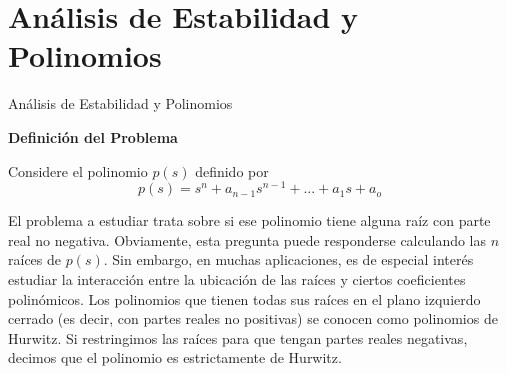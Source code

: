 \documentclass{beamer}
\begin{document}
\section{Análisis de Estabilidad y Polinomios}
\begin{frame}{Análisis de Estabilidad y Polinomios}
\begin{justify}
\textbf{Definición del Problema}
\vspace{0.3cm}

Considere el polinomio $p(s)$ definido por
\[p(s)=s^n+a_{n-1}s^{n-1}+ ... +a_1s+a_o\]



El problema a estudiar trata sobre si ese polinomio tiene alguna raíz con parte real no negativa. Obviamente, esta pregunta puede responderse calculando las $n$ raíces de $p(s)$. Sin embargo, en muchas aplicaciones, es de especial interés estudiar la interacción entre la ubicación de las raíces y ciertos coeficientes polinómicos. Los polinomios que tienen todas sus raíces en el plano izquierdo cerrado (es decir, con partes reales no positivas) se conocen como polinomios de Hurwitz. Si restringimos las raíces para que tengan partes reales negativas, decimos que el polinomio es estrictamente de Hurwitz.

\end{justify}
\end{frame}
\end{document}
